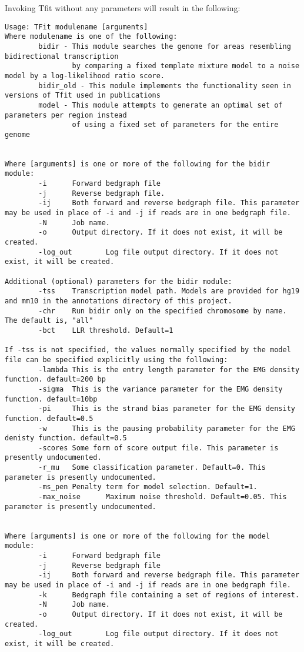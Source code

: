 \documentclass[12pt,letterpaper]{article}
\begin{document}
Invoking Tfit without any parameters will result in the following:
\begin{lstlisting}
Usage: TFit modulename [arguments]
Where modulename is one of the following:
        bidir - This module searches the genome for areas resembling bidirectional transcription
                by comparing a fixed template mixture model to a noise model by a log-likelihood ratio score.
        bidir_old - This module implements the functionality seen in versions of Tfit used in publications
        model - This module attempts to generate an optimal set of parameters per region instead 
                of using a fixed set of parameters for the entire genome


Where [arguments] is one or more of the following for the bidir module:
        -i      Forward bedgraph file
        -j      Reverse bedgraph file.
        -ij     Both forward and reverse bedgraph file. This parameter may be used in place of -i and -j if reads are in one bedgraph file.
        -N      Job name.
        -o      Output directory. If it does not exist, it will be created.
        -log_out        Log file output directory. If it does not exist, it will be created.

Additional (optional) parameters for the bidir module:
        -tss    Transcription model path. Models are provided for hg19 and mm10 in the annotations directory of this project.
        -chr    Run bidir only on the specified chromosome by name. The default is, "all"
        -bct    LLR threshold. Default=1

If -tss is not specified, the values normally specified by the model file can be specified explicitly using the following:
        -lambda This is the entry length parameter for the EMG density function. default=200 bp
        -sigma  This is the variance parameter for the EMG density function. default=10bp
        -pi     This is the strand bias parameter for the EMG density function. default=0.5
        -w      This is the pausing probability parameter for the EMG denisty function. default=0.5
        -scores Some form of score output file. This parameter is presently undocumented.
        -r_mu   Some classification parameter. Default=0. This parameter is presently undocumented.
        -ms_pen Penalty term for model selection. Default=1.
        -max_noise      Maximum noise threshold. Default=0.05. This parameter is presently undocumented.


Where [arguments] is one or more of the following for the model module:
        -i      Forward bedgraph file
        -j      Reverse bedgraph file
        -ij     Both forward and reverse bedgraph file. This parameter may be used in place of -i and -j if reads are in one bedgraph file.
        -k      Bedgraph file containing a set of regions of interest.
        -N      Job name.
        -o      Output directory. If it does not exist, it will be created.
        -log_out        Log file output directory. If it does not exist, it will be created.


\end{lstlisting}
\end{document}
